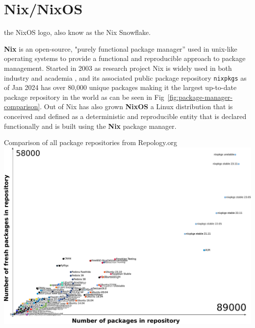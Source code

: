 \section{Nix/NixOS}

\begin{figureBox}[label={fig:nix-snowflake}]{the NixOS logo, also know as the Nix Snowflake.}

\end{figureBox}

\textbf{Nix} \cite{dolstra2004nix} is an open-source, "purely functional package manager” used in unix-like operating systems to provide a functional and reproducible approach to package management. Started in 2003 as research project Nix \cite{dolstra2006purely} is widely used in both industry \cite{NixCommunityNixOSWiki} and academia \cite{10.1145/3152493.3152556} \cite{https://doi.org/10.1002/qua.26872} \cite{LHCbNix}, and its associated public package repository \texttt{nixpkgs} \cite{NixPkgs} as of Jan 2024 has over 80,000 unique packages making it the largest up-to-date package repository in the world as can be seen in Fig~\ref{fig:package-manager-comparison}. Out of Nix has also grown \textbf{NixOS} \cite{10.1145/1411204.1411255} \label{nix-snowflake} a Linux distribution that is conceived and defined as a deterministic and reproducible entity that is declared functionally and is built using the \textbf{Nix} package manager. \\

\begin{figureBox}[label = {fig:package-manager-comparison}]{Comparison of all package repositories from Repology.org \cite{Marakasov_2024}}
\fontsize{5}{6}\selectfont
\includegraphics[width=\linewidth]{./figures/background/nix/pkg-compare.pdf}
\end{figureBox}

